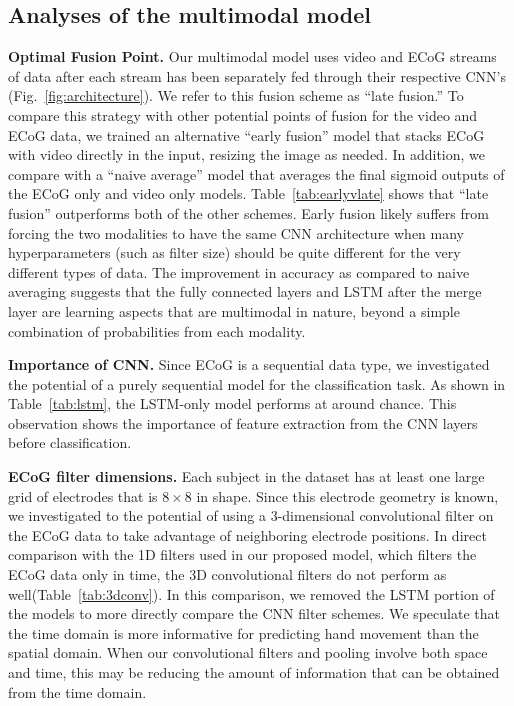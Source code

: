 \documentclass[letterpaper]{article} %
\begin{document}
\subsection{Analyses of the multimodal model}

\textbf{Optimal Fusion Point.} Our multimodal model uses video and ECoG streams of data after each stream has been separately fed through their respective CNN's (Fig.~\ref{fig:architecture}).
We refer to this fusion scheme as ``late fusion.''
To compare this strategy with other potential points of fusion for the video and ECoG data, we trained an alternative ``early fusion'' model that stacks ECoG with video directly in the input, resizing the image as needed.
In addition, we compare with a ``naive average'' model that averages the final sigmoid outputs of the ECoG only and video only models.
Table~\ref{tab:earlyvlate} shows that ``late fusion'' outperforms both of the other schemes.
Early fusion likely suffers from forcing the two modalities to have the same CNN architecture when many hyperparameters (such as filter size) should be quite different for the very different types of data. 
The improvement in accuracy as compared to naive averaging suggests that the fully connected layers and LSTM after the merge layer are learning aspects that are multimodal in nature, beyond a simple combination of probabilities from each modality. 


\textbf{Importance of CNN.} Since ECoG is a sequential data type, we investigated the potential of a purely sequential model for the classification task. 
As shown in Table~\ref{tab:lstm}, the LSTM-only model performs at around chance. 
This observation shows the importance of feature extraction from the CNN layers before classification. 


\textbf{ECoG filter dimensions.} Each subject in the dataset has at least one large grid of electrodes that is $8\times8$ in shape. 
Since this electrode geometry is known, we investigated to the potential of using a 3-dimensional convolutional filter on the ECoG data to take advantage of neighboring electrode positions.
In direct comparison with the 1D filters used in our proposed model, which filters the ECoG data only in time, the 3D convolutional filters do not perform as well(Table~\ref{tab:3dconv}).
In this comparison, we removed the LSTM portion of the models to more directly compare the CNN filter schemes. 
We speculate that the time domain is more informative for predicting hand movement than the spatial domain. 
When our convolutional filters and pooling involve both space and time, this may be reducing the amount of information that can be obtained from the time domain. 
\end{document}
